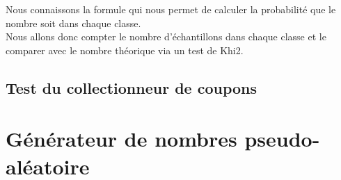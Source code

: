 \documentclass[a4paper,10pt]{article}
\begin{document}
Nous connaissons la formule qui nous permet de calculer la probabilité que le nombre soit dans chaque classe.\\

Nous allons donc compter le nombre d'échantillons dans chaque classe et le comparer avec le nombre théorique via un test de Khi2.


\subsection{Test du collectionneur de coupons}

\section{Générateur de nombres pseudo-aléatoire}
\end{document}
